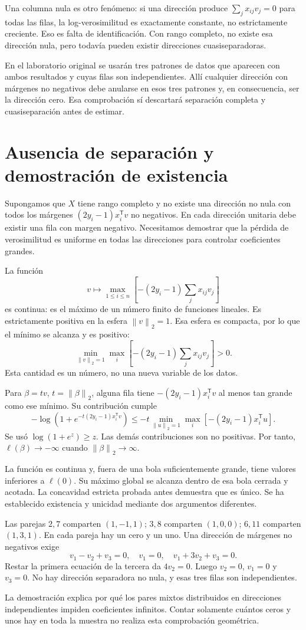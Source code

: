 \documentclass[11pt,a4paper]{article}
\newcommand{\T}{^{\mathsf T}}
\newcommand{\norm}[1]{\left\lVert #1\right\rVert}
\begin{document}
Una columna nula es otro fenómeno:
si una dirección produce $\sum_jx_{ij}v_j=0$ para todas las filas,
la log-verosimilitud es exactamente constante, no estrictamente creciente.
Eso es falta de identificación.
Con rango completo, no existe esa dirección nula,
pero todavía pueden existir direcciones cuasiseparadoras.

En el laboratorio original se usarán tres patrones de datos
que aparecen con ambos resultados y cuyas filas son independientes.
Allí cualquier dirección con márgenes no negativos
debe anularse en esos tres patrones y, en consecuencia,
ser la dirección cero. Esa comprobación sí descartará
separación completa y cuasiseparación antes de estimar.

\clearpage
\section{Ausencia de separación y demostración de existencia}\label{logit38}
Supongamos que $X$ tiene rango completo y no existe una dirección
no nula con todos los márgenes $(2y_i-1)x_i\T v$ no negativos.
En cada dirección unitaria debe existir una fila con margen negativo.
Necesitamos demostrar que la pérdida de verosimilitud es uniforme
en todas las direcciones para controlar coeficientes grandes.

La función
\[
v\longmapsto \max_{1\le i\le n}
\left[-(2y_i-1)\sum_jx_{ij}v_j\right]
\]
es continua: es el máximo de un número finito de funciones lineales.
Es estrictamente positiva en la esfera $\norm v_2=1$.
Esa esfera es compacta, por lo que el mínimo se alcanza y es positivo:
\[
\min_{\norm v_2=1}\max_i
\left[-(2y_i-1)\sum_jx_{ij}v_j\right]>0.
\]
Esta cantidad es un número, no una nueva variable de los datos.

Para $\beta=tv$, $t=\norm\beta_2$, alguna fila tiene
$-(2y_i-1)x_i\T v$ al menos tan grande como ese mínimo.
Su contribución cumple
\[
-\log(1+e^{-t(2y_i-1)x_i\T v})
\le -t\min_{\norm u_2=1}\max_i[-(2y_i-1)x_i\T u].
\]
Se usó $\log(1+e^z)\ge z$.
Las demás contribuciones son no positivas.
Por tanto, $\ell(\beta)\to-\infty$ cuando $\norm\beta_2\to\infty$.

La función es continua y, fuera de una bola suficientemente grande,
tiene valores inferiores a $\ell(0)$.
Su máximo global se alcanza dentro de esa bola cerrada y acotada.
La concavidad estricta probada antes demuestra que es único.
Se ha establecido existencia y unicidad mediante dos argumentos diferentes.

\begin{ejemplo}
Las parejas $2,7$ comparten $(1,-1,1)$;
$3,8$ comparten $(1,0,0)$;
$6,11$ comparten $(1,3,1)$.
En cada pareja hay un cero y un uno.
Una dirección de márgenes no negativos exige
\[
v_1-v_2+v_3=0,\quad v_1=0,\quad v_1+3v_2+v_3=0.
\]
Restar la primera ecuación de la tercera da $4v_2=0$.
Luego $v_2=0$, $v_1=0$ y $v_3=0$.
No hay dirección separadora no nula, y esas tres filas son independientes.
\end{ejemplo}
La demostración explica por qué los pares mixtos distribuidos en
direcciones independientes impiden coeficientes infinitos.
Contar solamente cuántos ceros y unos hay en toda la muestra
no realiza esta comprobación geométrica.
\end{document}
